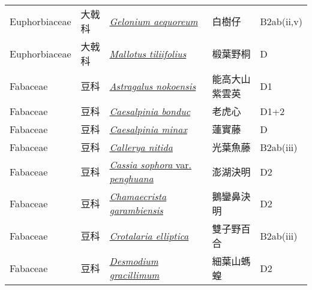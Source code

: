 {\begin{longtable}{p{2.5cm}p{2cm}p{5cm}p{2.5cm}p{3cm}}
    Euphorbiaceae & 大戟科 & \href{http://www.theplantlist.org/tpl1.1/search?q=Gelonium+aequoreum}{\textit{Gelonium aequoreum} } & 白樹仔 & B2ab(ii,v) \index{Gelonium@\textit{Gelonium}!aequoreum@\textit{aequoreum}}  \index{白樹仔} \\
    Euphorbiaceae & 大戟科 & \href{http://www.theplantlist.org/tpl1.1/search?q=Mallotus+tiliifolius}{\textit{Mallotus tiliifolius} } & 椴葉野桐 & D　 \index{Mallotus@\textit{Mallotus}!tiliifolius@\textit{tiliifolius}}  \index{椴葉野桐} \\
    Fabaceae & 豆科 & \href{http://www.theplantlist.org/tpl1.1/search?q=Astragalus+nokoensis}{\textit{Astragalus nokoensis} } & 能高大山紫雲英 & D1 \index{Astragalus@\textit{Astragalus}!nokoensis@\textit{nokoensis}}  \index{能高大山紫雲英} \\
    Fabaceae & 豆科 & \href{http://www.theplantlist.org/tpl1.1/search?q=Caesalpinia+bonduc}{\textit{Caesalpinia bonduc} } & 老虎心 & D1+2 \index{Caesalpinia@\textit{Caesalpinia}!bonduc@\textit{bonduc}}  \index{老虎心} \\
    Fabaceae & 豆科 & \href{http://www.theplantlist.org/tpl1.1/search?q=Caesalpinia+minax}{\textit{Caesalpinia minax} } & 蓮實藤 & D \index{Caesalpinia@\textit{Caesalpinia}!minax@\textit{minax}}  \index{蓮實藤} \\
    Fabaceae & 豆科 & \href{http://www.theplantlist.org/tpl1.1/search?q=Callerya+nitida}{\textit{Callerya nitida} } & 光葉魚藤 & B2ab(iii) \index{Callerya@\textit{Callerya}!nitida@\textit{nitida}}  \index{光葉魚藤} \\
    Fabaceae & 豆科 & \href{http://www.theplantlist.org/tpl1.1/search?q=Cassia+sophora+var.+penghuana}{\textit{Cassia sophora} var. \textit{penghuana} } & 澎湖決明 & D2 \index{Cassia@\textit{Cassia}!sophora@\textit{sophora}!var. penghuana@var. \textit{penghuana}}  \index{澎湖決明} \\
    Fabaceae & 豆科 & \href{http://www.theplantlist.org/tpl1.1/search?q=Chamaecrista+garambiensis}{\textit{Chamaecrista garambiensis} } & 鵝鑾鼻決明 & D2 \index{Chamaecrista@\textit{Chamaecrista}!garambiensis@\textit{garambiensis}}  \index{鵝鑾鼻決明} \\
    Fabaceae & 豆科 & \href{http://www.theplantlist.org/tpl1.1/search?q=Crotalaria+elliptica}{\textit{Crotalaria elliptica} } & 雙子野百合 & B2ab(iii) \index{Crotalaria@\textit{Crotalaria}!elliptica@\textit{elliptica}}  \index{雙子野百合} \\
    Fabaceae & 豆科 & \href{http://www.theplantlist.org/tpl1.1/search?q=Desmodium+gracillimum}{\textit{Desmodium gracillimum} } & 細葉山螞蝗 & D2 \index{Desmodium@\textit{Desmodium}!gracillimum@\textit{gracillimum}}  \index{細葉山螞蝗} \\

\end{longtable}}
